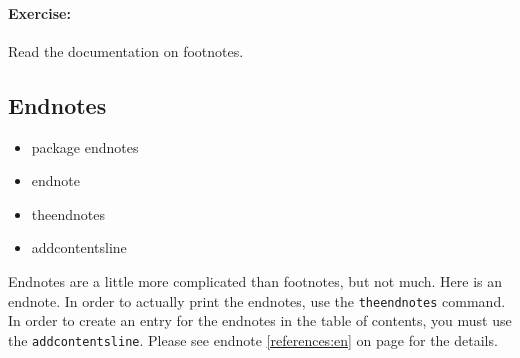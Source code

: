         \paragraph{Exercise:} Read the \LaTeXe{} documentation on footnotes.

    \subsection{Endnotes}
    \label{Endnotes}
        
        \begin{framed}
            \begin{itemize}
                \item{package endnotes}
                \item{endnote}
                \item{theendnotes}
                \item{addcontentsline}
            \end{itemize}
        \end{framed}

    Endnotes are a little more complicated than footnotes, but not much. Here is an endnote. In order to actually print the endnotes, use the \texttt{theendnotes} command. In order to create an entry for the endnotes in the table of contents, you must use the \texttt{addcontentsline}. Please see endnote \ref{references:en} on page \pageref{references:en} for the details.

